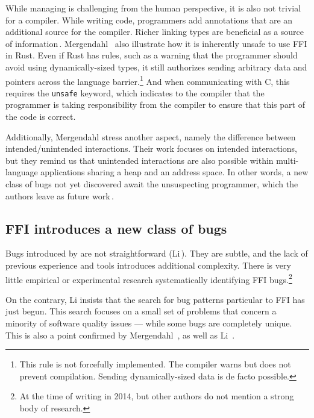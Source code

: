 \documentclass[nomenclature, english, bibtex]{kththesis}
\begin{document}
While managing  is challenging from the human perspective, it is also not trivial for a compiler. While writing code, programmers add annotations that are an additional source for the compiler. Richer linking types are beneficial as a source of information\,\cite{patterson_linking_2017}. Mergendahl \etal\,\cite{mergendahl_cross-language_2022} also illustrate how it is inherently unsafe to use FFI in Rust. Even if Rust has rules, such as a warning that the programmer should avoid using dynamically-sized types, it still authorizes sending arbitrary data and pointers across the language barrier.\footnote{This rule is not forcefully implemented. The compiler warns but does not prevent compilation. Sending dynamically-sized data is de facto possible.} 
And when communicating with C, this requires the \texttt{unsafe} keyword, which indicates to the compiler that the programmer is taking responsibility from the compiler to ensure that this part of the code is correct.

Additionally, Mergendahl \etal stress another aspect, namely the difference between intended/unintended interactions. Their work focuses on intended interactions, but they remind us that unintended interactions are also possible within multi-language applications sharing a heap and an address space. In other words, a new class of bugs not yet discovered await the unsuspecting programmer, which the authors leave as future work\,\cite{mergendahl_cross-language_2022}.

\subsection{FFI introduces a new class of bugs}

Bugs introduced by  are not straightforward (Li\,\cite{li_improving_2014}). They are subtle, and the lack of previous experience and tools introduces additional complexity. There is very little empirical or experimental research systematically identifying FFI bugs.\footnote{At the time of writing in 2014, but other authors do not mention a strong body of research.}

On the contrary, Li insists that the search for bug patterns particular to FFI has just begun. This search focuses on a small set of problems that concern a minority of software quality issues --- while some bugs are completely unique. This is also a point confirmed by Mergendahl \etal\,\cite{mergendahl_cross-language_2022}, as well as Li \etal\,\cite{li_detecting_2022}.
\end{document}
